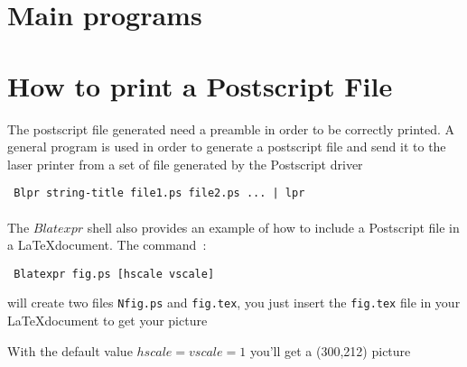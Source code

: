 \section{Main programs}

 

 

\section{How to print a Postscript File}
The postscript file generated need a preamble in order to be correctly 
 printed. A general program is used in order to generate a postscript file 
 and send it to the laser printer from a set of file generated by the 
 Postscript driver  
\begin{verbatim}
 Blpr string-title file1.ps file2.ps ... | lpr 
\end{verbatim}

\paragraph{}The $Blatexpr$ shell also provides an example of how to include 
a Postscript file in a \LaTeX document. The command~:
\begin{verbatim}
 Blatexpr fig.ps [hscale vscale] 
\end{verbatim}
will create two files \verb+Nfig.ps+ and \verb+fig.tex+, you just insert the 
\verb+fig.tex+ file in your \LaTeX document to get your picture 

With the default value $hscale=vscale=1$ you'll get a (300,212) picture 

